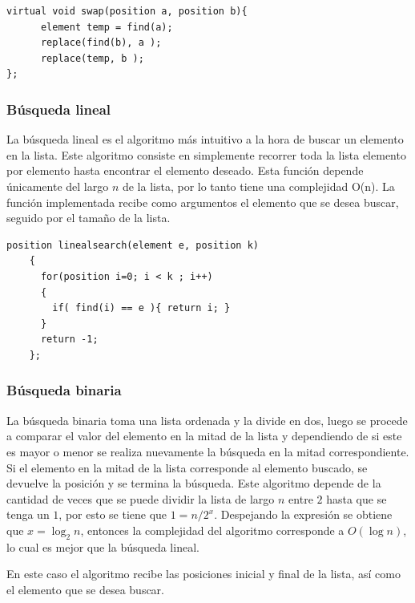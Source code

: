 \begin{verbatim}
virtual void swap(position a, position b){
      element temp = find(a);
      replace(find(b), a );
      replace(temp, b );
};
\end{verbatim}





\subsubsection{Búsqueda lineal}
La búsqueda lineal es el algoritmo más intuitivo a la hora de buscar un elemento en la lista. Este algoritmo consiste en simplemente recorrer toda la lista elemento por elemento hasta encontrar el elemento deseado. Esta función depende únicamente del largo $n$ de la lista, por lo tanto tiene una complejidad O(n). La función implementada recibe como argumentos el elemento que se desea buscar, seguido por el tamaño de la lista.

\begin{verbatim}
position linealsearch(element e, position k)
    {
      for(position i=0; i < k ; i++)
      {
        if( find(i) == e ){ return i; }
      }
      return -1;
    };
\end{verbatim}

\subsubsection{Búsqueda binaria}
La búsqueda binaria toma una lista ordenada y la divide en dos, luego se procede a comparar el valor del elemento en la mitad de la lista y dependiendo de si este es mayor o menor se realiza nuevamente la búsqueda en la mitad correspondiente. Si el elemento en la mitad de la lista corresponde al elemento buscado, se devuelve la posición y se termina la búsqueda. Este algoritmo depende de la cantidad de veces que se puede dividir la lista de largo $n$ entre $2$ hasta que se tenga un $1$, por esto se tiene que $1=n/2^x$. Despejando la expresión se obtiene que $x=\log_2 n$, entonces la complejidad del algoritmo corresponde a $O(\log n)$\cite{R3}, lo cual es mejor que la búsqueda lineal.

En este caso el algoritmo recibe las posiciones inicial y final de la lista, así como el elemento que se desea buscar.

